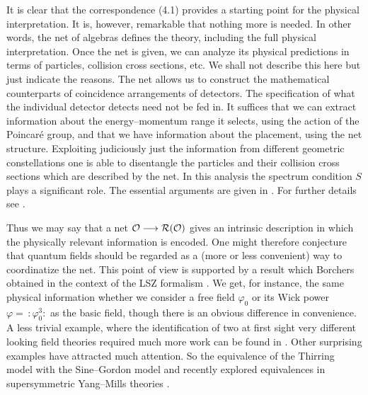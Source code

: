 It is clear that the correspondence (4.1) provides a starting 
point for the physical interpretation. It is, however, remarkable
that nothing more is needed. In other words, the net of algebras 
defines the theory, including the full physical interpretation. 
Once the net is given, we can analyze its physical predictions in 
terms of particles, collision cross sections, etc. We shall not
describe this here but just indicate the reasons. The net allows us 
to construct the mathematical counterparts of coincidence
arrangements of detectors. The specification of what the
individual detector detects need not be fed in. 
It suffices that we can extract information about the energy--momentum
range it selects, using the action of the Poincar\'e group, and 
that we have information about the placement, using the net structure. 
Exploiting judiciously
just the information from different geometric constellations one is
able to disentangle the particles and their collision cross sections
which are described by the net. 
In this analysis the spectrum condition $S$ plays a
significant role. The essential arguments are given in 
\cite{ArHa,BuPoSt}. For further details see \cite{Ha}.

Thus we may say that a net 
$\cal O \longrightarrow {\cal R}({\cal O})$ gives an intrinsic
description in which the physically relevant information is
encoded. One might therefore conjecture that quantum fields should be
regarded as a (more or less convenient) way to coordinatize the
net. This point of view is supported by a result which Borchers
obtained in the context of the LSZ formalism \cite{Bo}. We get, for
instance, the same physical information whether we consider a free
field $\varphi_0$ or its Wick power $\varphi = \, : \! \varphi_0^3 \! :$ 
as the basic
field, though there is an obvious difference in convenience. A less
trivial example, where the identification of two at first sight very
different looking field theories required much more work can be found
in \cite{Re}. Other surprising examples have attracted much
attention. So the equivalence of the Thirring model with the
Sine--Gordon model \cite{Co} and recently explored equivalences in
supersymmetric Yang--Mills theories \cite{Se}.

